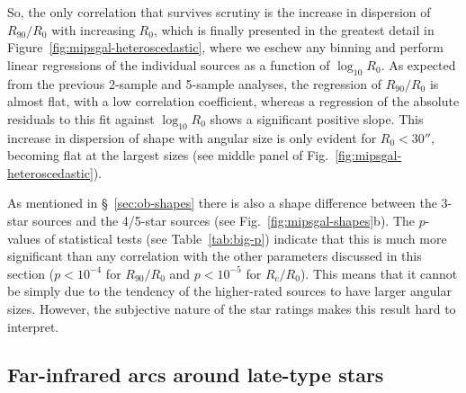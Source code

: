 So, the only correlation that survives scrutiny is the increase in
dispersion of \(R_{90}/R_0\) with increasing \(R_0\), which is finally
presented in the greatest detail in
Figure~\ref{fig:mipsgal-heteroscedastic}, where we eschew any binning
and perform linear regressions of the individual sources as a function
of \(\log_{10} R_0\).  As expected from the previous 2-sample and
5-sample analyses, the regression of \(R_{90}/R_0\) is almost flat,
with a low correlation coefficient, whereas a regression of the
absolute residuals to this fit against \(\log_{10} R_0\) shows a
significant positive slope.  This increase in dispersion of shape with
angular size is only evident for \(R_0 < 30''\), becoming flat at the
largest sizes (see middle panel of
Fig.~\ref{fig:mipsgal-heteroscedastic}).

As mentioned in \S~\ref{sec:ob-shapes} there is also a shape
difference between the 3-star sources and the 4/5-star sources (see
Fig.~\ref{fig:mipsgal-shapes}b).  The \(p\)-values of statistical
tests (see Table~\ref{tab:big-p}) indicate that this is much more
significant than any correlation with the other parameters discussed
in this section (\(p < 10^{-4}\) for \(R_{90}/R_0\) and
\(p < 10^{-5}\) for \(R_c/R_0\)).  This means that it cannot be simply
due to the tendency of the higher-rated sources to have larger angular
sizes.  However, the subjective nature of the star ratings makes this
result hard to interpret.

\subsection{Far-infrared arcs around late-type stars}
\label{sec:far-infrared-arcs}



